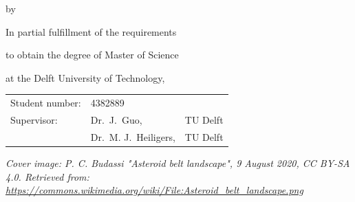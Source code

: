 \begin{titlepage}


\begin{center}


{\makeatletter
\largetitlestyle\fontsize{48}{48}\selectfont\@title
\makeatother}

{\makeatletter
\ifx\@subtitle\undefined\else
    \bigskip
   {\tudsffamily\fontsize{22}{32}\selectfont\@subtitle}    
\fi
\makeatother}

\bigskip
\bigskip

by

\bigskip
\bigskip

{\makeatletter
\largetitlestyle\fontsize{26}{26}\selectfont\@author
\makeatother}

\bigskip
\bigskip

In partial fulfillment of the requirements

to obtain the degree of Master of Science

at the Delft University of Technology,

\vfill

\begin{tabular}{lll}
    Student number: & 4382889 \\
    Supervisor: & Dr.\ J.\ Guo, & TU Delft \\
     & Dr.\ M. J.\ Heiligers, & TU Delft
\end{tabular}

\bigskip
\bigskip
\emph{Cover image: P. C. Budassi "Asteroid belt landscape", 9 August 2020, CC BY-SA 4.0. Retrieved from: \url{https://commons.wikimedia.org/wiki/File:Asteroid_belt_landscape.png}}




\end{center}


\end{titlepage}

